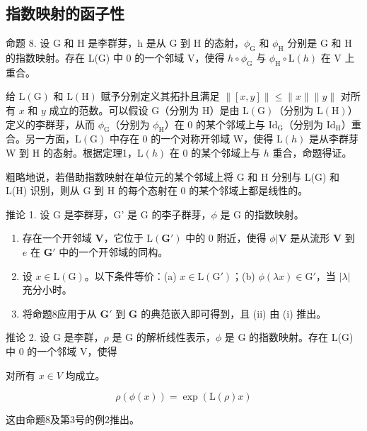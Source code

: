 \subsection{指数映射的函子性}

命题 8. 设 G 和 H 是李群芽，h 是从 G 到 H 的态射，\(\phi_{\mathrm{G}}\) 和 \(\phi_{\mathrm{H}}\) 分别是 G 和 H 的指数映射。存在 L(G) 中 0 的一个邻域 V，使得 \(h \circ \phi_{\mathrm{G}}\) 与 \(\phi_{\mathrm{H}} \circ \mathrm{L}(h)\) 在 V 上重合。

给 \(\mathrm{L}(\mathrm{G})\) 和 \(\mathrm{L}(\mathrm{H})\) 赋予分别定义其拓扑且满足 \(\| [x,y]\| \leqslant \| x\| \| y\|\) 对所有 \(x\) 和 \(y\) 成立的范数。可以假设 \(\mathrm{G}\)（分别为 H）是由 \(\mathrm{L}(\mathrm{G})\)（分别为 \(\mathrm{L}(\mathrm{H})\)）定义的李群芽，从而 \(\phi_{\mathrm{G}}\)（分别为 \(\phi_{\mathrm{H}}\)）在 0 的某个邻域上与 \(\mathrm{Id}_{\mathrm{G}}\)（分别为 \(\mathrm{Id}_{\mathrm{H}}\)）重合。另一方面，\(\mathrm{L}(\mathrm{G})\) 中存在 0 的一个对称开邻域 W，使得 \(\mathrm{L}(h)\) 是从李群芽 W 到 H 的态射。根据定理1，\(\mathrm{L}(h)\) 在 0 的某个邻域上与 \(h\) 重合，命题得证。

粗略地说，若借助指数映射在单位元的某个邻域上将 G 和 H 分别与 L(G) 和 L(H) 识别，则从 G 到 H 的每个态射在 0 的某个邻域上都是线性的。

推论 1. 设 G 是李群芽，G' 是 G 的李子群芽，\(\phi\) 是 G 的指数映射。

\begin{enumerate}
\def\labelenumi{(\roman{enumi})}
\item
  存在一个开邻域 \(\mathbf{V}\)，它位于 \(\mathrm{L}(\mathbf{G}')\) 中的 0 附近，使得 \(\phi | \mathbf{V}\) 是从流形 \(\mathbf{V}\) 到 \(e\) 在 \(\mathbf{G}'\) 中的一个开邻域的同构。
\item
  设 \(x \in \mathrm{L}(\mathrm{G})\)。以下条件等价：(a) \(x \in \mathrm{L}(\mathrm{G}')\)；(b) \(\phi(\lambda x) \in \mathrm{G}'\)，当 \(|\lambda|\) 充分小时。
\item
  将命题8应用于从 \(\mathbf{G}'\) 到 \(\mathbf{G}\) 的典范嵌入即可得到，且 (ii) 由 (i) 推出。
\end{enumerate}

推论 2. 设 G 是李群，\(\rho\) 是 G 的解析线性表示，\(\phi\) 是 G 的指数映射。存在 L(G) 中 0 的一个邻域 V，使得

对所有 \(x \in V\) 均成立。

\[
\rho (\phi (x)) = \exp (\mathrm{L} (\rho) x)
\]

这由命题8及第3号的例2推出。

